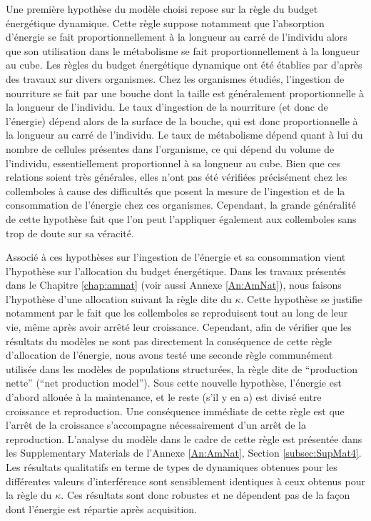 Une première hypothèse du modèle choisi repose sur la règle du budget
énergétique dynamique. Cette règle suppose notamment que l'absorption d'énergie
se fait proportionnellement à la longueur au carré de l'individu alors que son 
utilisation dans le métabolisme se fait proportionnellement à la longueur au
cube.
Les règles du budget énergétique dynamique ont été établies par \textcites{kooijman2000a}
d'après des travaux sur divers organismes. Chez les organismes étudiés,
l'ingestion de nourriture se fait par une bouche dont la taille est généralement
proportionnelle à la longueur de l'individu. Le taux d'ingestion de la
nourriture (et donc de l'énergie) dépend alors de la surface de la bouche, qui
est donc proportionnelle à la longueur au carré de l'individu. Le taux de
métabolisme dépend quant à lui du nombre de cellules présentes dans
l'organisme, ce qui dépend du volume de l'individu, essentiellement
proportionnel à sa longueur au cube. Bien que ces relations soient très
générales, elles n'ont pas été vérifiées précisément chez les collemboles à
cause des difficultés que posent la mesure de l'ingestion et de la consommation
de l'énergie chez ces organismes. Cependant, la grande généralité de cette
hypothèse fait que l'on peut l'appliquer également aux collemboles sans trop
de doute sur sa véracité.

Associé à ces hypothèses sur l'ingestion de l'énergie et sa consommation vient
l'hypothèse sur l'allocation du budget énergétique. Dans les travaux présentés
dans le Chapitre \ref{chap:amnat} (voir aussi Annexe \ref{An:AmNat}), nous
faisons l'hypothèse d'une allocation suivant la règle dite du $\kappa$. Cette
hypothèse se justifie notamment par le fait que les collemboles se reproduisent
tout au long de leur vie, même après avoir arrêté leur croissance. Cependant,
afin de vérifier que les résultats du modèles ne sont pas directement la
conséquence de cette règle d'allocation de l'énergie, nous avons testé une
seconde règle communément utilisée dans les modèles de populations structurées,
la règle dite de ``production nette'' (``net production model''). Sous cette
nouvelle hypothèse, l'énergie est d'abord allouée à la maintenance, et le reste
(s'il y en a) est divisé entre croissance et reproduction. Une conséquence
immédiate de cette règle est que l'arrêt de la croissance s'accompagne
nécessairement d'un arrêt de la reproduction. L'analyse du modèle dans le cadre
de cette règle est présentée dans les Supplementary Materials de
l'Annexe \ref{An:AmNat}, Section \ref{subsec:SupMat4}. Les résultats qualitatifs
en terme de types de dynamiques obtenues pour les différentes valeurs
d'interférence sont sensiblement identiques à ceux obtenus pour la règle du
$\kappa$. Ces résultats sont donc robustes et ne dépendent pas de la façon dont
l'énergie est répartie après acquisition.

